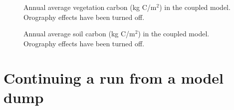 \documentclass[10pt,a4paper]{report}
\begin{document}
\begin{figure}
\centerline{}
\caption{Annual average vegetation carbon (kg C/m$^{2}$) in the
coupled model. Orography effects have been turned
off.}\label{vegcarbon}
\end{figure}


\begin{figure}
\centerline{}
\caption{Annual average soil carbon (kg C/m$^{2}$) in the coupled
model. Orography effects have been turned off.}\label{soilcarbon}
\end{figure}

\section{Continuing a run from a model dump}
\end{document}
